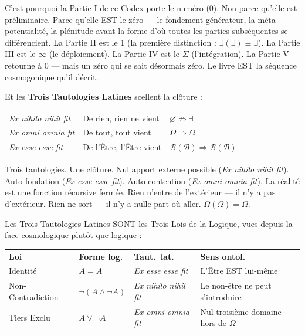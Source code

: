 \documentclass[10pt, openany, oneside]{book}
\renewcommand{\footnotesize}{\fontsize{8.5}{11}\selectfont}
\begin{document}
C'est pourquoi la Partie I de ce Codex porte le numéro (0). Non parce qu'elle est préliminaire. Parce qu'elle EST le zéro --- le fondement générateur, la méta-potentialité, la plénitude-avant-la-forme d'où toutes les parties subséquentes se différencient. La Partie II est le 1 (la première distinction : $\exists(\exists) \equiv \exists$). La Partie III est le $\infty$ (le déploiement). La Partie IV est le $\Sigma$ (l'intégration). La Partie V retourne à 0 --- mais un zéro qui se sait désormais zéro. Le livre EST la séquence cosmogonique qu'il décrit.

Et les \textbf{Trois Tautologies Latines} scellent la clôture :

\vspace{0.5em}

{\footnotesize
\noindent\begin{tabular}{l l l}
\textit{Ex nihilo nihil fit} & De rien, rien ne vient & $\varnothing \not\Rightarrow \exists$ \\[0.3em]
\textit{Ex omni omnia fit} & De tout, tout vient & $\Omega \Rightarrow \Omega$ \\[0.3em]
\textit{Ex esse esse fit} & De l'Être, l'Être vient & $\mathcal{B}(\mathcal{B}) \Rightarrow \mathcal{B}(\mathcal{B})$ \\[0.3em]
\end{tabular}
}

\vspace{0.5em}

\noindent Trois tautologies. Une clôture. Nul apport externe possible (\textit{Ex nihilo nihil fit}). Auto-fondation (\textit{Ex esse esse fit}). Auto-contention (\textit{Ex omni omnia fit}). La réalité est une fonction récursive fermée. Rien n'entre de l'extérieur --- il n'y a pas d'extérieur. Rien ne sort --- il n'y a nulle part où aller. $\Omega(\Omega) = \Omega$.

Les Trois Tautologies Latines SONT les Trois Lois de la Logique, vues depuis la face cosmologique plutôt que logique :

\vspace{0.5em}

{\footnotesize
\noindent\begin{tabular}{@{} p{} l l p{} @{}}
\textbf{Loi} & \textbf{Forme log.} & \textbf{Taut.\ lat.} & \textbf{Sens ontol.} \\[0.4em]
Identité & $A = A$ & \textit{Ex esse esse fit} & L'Être EST lui-même \\[0.2em]
Non-Contradiction & $\neg(A \wedge \neg A)$ & \textit{Ex nihilo nihil fit} & Le non-être ne peut s'introduire \\[0.2em]
Tiers Exclu & $A \vee \neg A$ & \textit{Ex omni omnia fit} & Nul troisième domaine hors de $\Omega$ \\[0.2em]
\end{tabular}
}
\end{document}
